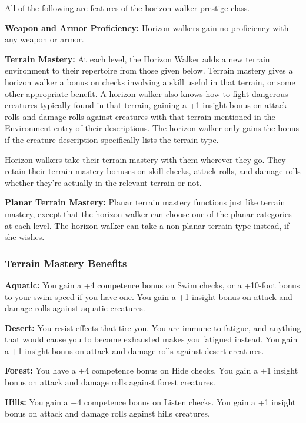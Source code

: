 \ClassFeatures

All of the following are features of the horizon walker prestige class.

\textbf{Weapon and Armor Proficiency:} Horizon walkers gain no proficiency with 
any weapon or armor.

\textbf{Terrain Mastery:} At each level, the Horizon Walker adds a new terrain 
environment to their repertoire from those given below. Terrain mastery gives a 
horizon walker a bonus on checks involving a skill useful in that terrain, or some 
other appropriate benefit. A horizon walker also knows how to fight dangerous creatures 
typically found in that terrain, gaining a +1 insight bonus on attack rolls and 
damage rolls against creatures with that terrain mentioned in the Environment entry 
of their descriptions. The horizon walker only gains the bonus if the creature 
description specifically lists the terrain type.

Horizon walkers take their terrain mastery with them wherever they go. They retain 
their terrain mastery bonuses on skill checks, attack rolls, and damage rolls whether 
they're actually in the relevant terrain or not.

\textbf{Planar Terrain Mastery:} Planar terrain mastery functions just like terrain 
mastery, except that the horizon walker can choose one of the planar categories 
at each level. The horizon walker can take a non-planar terrain type instead, if 
she wishes.

\subsubsection{Terrain Mastery Benefits}

\textbf{Aquatic:} You gain a +4 competence bonus on Swim checks, or a +10-foot 
bonus to your swim speed if you have one. You gain a +1 insight bonus on attack 
and damage rolls against aquatic creatures.

\textbf{Desert: }You resist effects that tire you. You are immune to fatigue, and 
anything that would cause you to become exhausted makes you fatigued instead. You 
gain a +1 insight bonus on attack and damage rolls against desert creatures.

\textbf{Forest:} You have a +4 competence bonus on Hide checks. You gain a +1 insight 
bonus on attack and damage rolls against forest creatures.

\textbf{Hills:} You gain a +4 competence bonus on Listen checks. You gain a +1 
insight bonus on attack and damage rolls against hills creatures.

